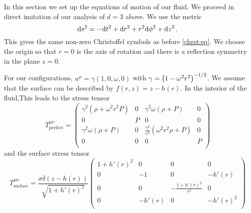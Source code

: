 In this section we set up the equations of motion of our fluid. We
proceed in direct imitation of our analysis of $d=3$ above. We use
the metric
%
\begin{equation}\label{metric4d:eq}
  \mathrm{d} s^2 = -\mathrm{d} t^2 + \mathrm{d} r^2 + r^2 \mathrm{d} \phi^2 + \mathrm{d} z^2\,.
\end{equation}
%
This gives the same non-zero Christoffel symbols as before
\eqref{chrst:eq}. We choose the origin so that $r=0$ is the axis of
rotation and there is a reflection symmetry in the plane $z=0$.


For our configurations, $u^\mu = \gamma(1,0,\omega,0)$ with
$\gamma=\left ( 1-\omega^2r^2 \right )^{-1/2}$. We assume that the surface can
be described by $f(r,z) = z- h(r)$. In the interior of the
fluid,This leads to the stress tensor
%
\begin{equation}\label{blkstr4d:eq}
 T^{\mu\nu}_\mathrm{perfect} =
 \begin{pmatrix}
  \gamma^2(\rho+\omega^2r^2P) & 0 & \gamma^2\omega(\rho+P)                  & 0 \\
  0                           & P & 0                                       & 0 \\
  \gamma^2\omega(\rho+P)      & 0 & \frac{\gamma^2}{r^2}(\omega^2r^2\rho+P) & 0 \\
  0                           & 0 & 0                                       & P \\
 \end{pmatrix}
\end{equation}
%
and the surface stress tensor
%
\begin{equation}\label{srfstr4d:eq}
 T^{\mu\nu}_\mathrm{surface} =
   \frac{\sigma \delta(z- h(r))}{\sqrt{1+h'(r)^2}}
 \begin{pmatrix}
  1+h'(r)^2 & 0      & 0                      & 0        \\
  0         & -1     & 0                      & -h'(r)   \\
  0         & 0      & -\frac{1+h'(r)^2}{r^2} & 0        \\
  0         & -h'(r) & 0                      & -h'(r)^2 \\
 \end{pmatrix}
\end{equation}
%

